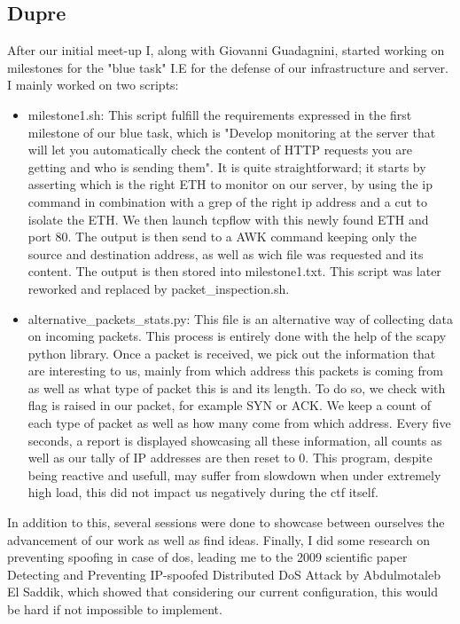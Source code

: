 \documentclass[14pt]{article}
\begin{document}
\subsection{Dupre}
After our initial meet-up I, along with Giovanni Guadagnini, started working on milestones for the "blue task" I.E for the defense of our infrastructure and server. I mainly worked on two scripts:
\begin{itemize}
	\item milestone1.sh: This script  fulfill the requirements expressed in the first milestone of our blue task, which is "Develop monitoring at the server that will let 	you automatically check the content of HTTP requests you are getting and who is sending them". It is quite straightforward; it starts by asserting which is the right ETH  to monitor on our server, by using the ip command in combination with a grep of the right ip address and a cut to isolate the ETH. We then launch tcpflow with this newly found ETH and port 80. The output is then send to a AWK command keeping only the source and destination address, as well as wich file was requested and its content. The output is then stored into milestone1.txt. This script was later reworked and  replaced by packet\_inspection.sh.	
	
	
	\item alternative\_packets\_stats.py: This file is an alternative way of collecting data on incoming packets. This process is entirely done with the help of the scapy python library. Once a packet is received, we pick out the information that are interesting to us, mainly from which address this packets is coming from as well as what type of packet this is and its length. To do so, we check with flag is raised in our packet, for example SYN or ACK. We keep a count of each type of packet as well as how many come from which address. Every five seconds, a report is displayed showcasing all these information, all counts as well as our tally of IP addresses are then reset to 0. This program, despite being reactive and usefull, may suffer from slowdown when under extremely high load, this did not impact us negatively during the ctf itself.
\end{itemize}

In addition to this, several sessions were done to showcase between ourselves the advancement of our work as well as find ideas. Finally, I did some research on preventing spoofing in case of dos, leading me to the 2009 scientific paper Detecting and Preventing IP-spoofed Distributed DoS Attack by Abdulmotaleb El Saddik, which showed that considering our current configuration, this would be hard if not impossible to implement.
\end{document}
